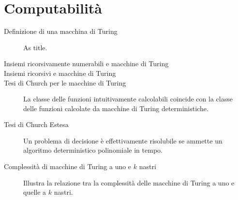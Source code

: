 \documentclass{lectures}
\begin{document}
\section{Computabilità}
\begin{multicols}{2}
\begin{description}
    \item[Definizione di una macchina di Turing] As title.
    \item[Insiemi ricorsivamente numerabili e macchine di Turing]
    \item[Insiemi ricorsivi e macchine di Turing]
    \item[Tesi di Church per le macchine di Turing] La classe delle funzioni intuitivamente calcolabili coincide con la classe delle funzioni calcolate da macchine di Turing deterministiche.
    \item[Tesi di Church Estesa] Un problema di decisione è effettivamente risolubile se ammette un algoritmo deterministico polinomiale in tempo.
    \item[Complessità di macchine di Turing a uno e \(k\) nastri] Illustra la relazione tra la complessità delle macchine di Turing a uno e quelle a \(k\) nastri.
\end{description}
\end{multicols}
\end{document}
